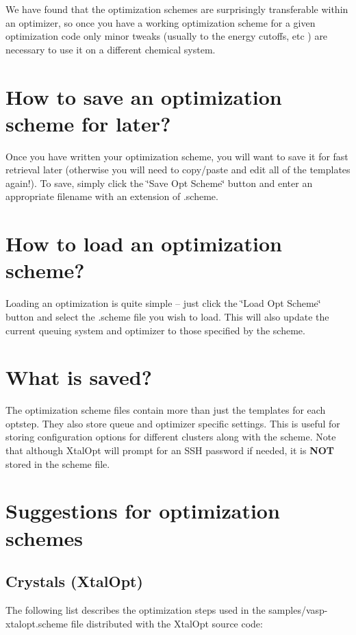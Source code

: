 We have found that the optimization schemes are surprisingly transferable within an optimizer, so once you have a working optimization scheme for a given optimization code only minor tweaks (usually to the energy cutoffs, etc ) are necessary to use it on a different chemical system.\hypertarget{optschemes_saving}{}\section{How to save an optimization scheme for later?}\label{optschemes_saving}
Once you have written your optimization scheme, you will want to save it for fast retrieval later (otherwise you will need to copy/paste and edit all of the templates again!). To save, simply click the \char`\"{}\-Save Opt
\-Scheme\char`\"{} button and enter an appropriate filename with an extension of .scheme.\hypertarget{optschemes_loading}{}\section{How to load an optimization scheme?}\label{optschemes_loading}
Loading an optimization is quite simple -- just click the \char`\"{}\-Load Opt
\-Scheme\char`\"{} button and select the .scheme file you wish to load. This will also update the current queuing system and optimizer to those specified by the scheme.\hypertarget{optschemes_format}{}\section{What is saved?}\label{optschemes_format}
The optimization scheme files contain more than just the templates for each optstep. They also store queue and optimizer specific settings. This is useful for storing configuration options for different clusters along with the scheme. Note that although Xtal\-Opt will prompt for an S\-S\-H password if needed, it is {\bfseries N\-O\-T} stored in the scheme file.\hypertarget{optschemes_suggest}{}\section{Suggestions for optimization schemes}\label{optschemes_suggest}
\hypertarget{optschemes_sug-xtal}{}\subsection{Crystals (\-Xtal\-Opt)}\label{optschemes_sug-xtal}
The following list describes the optimization steps used in the samples/vasp-\/xtalopt.\-scheme file distributed with the Xtal\-Opt source code\-:
